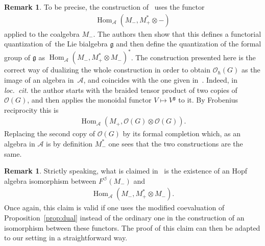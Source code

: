 \documentclass[11pt]{article}
\numberwithin{equation}{section}
\newcommand{\ca}{\circlearrowleft}
\newcommand{\mf}[1]{\mathfrak{#1}}
\newcommand{\h}{\hslash}
\newcommand{\ot}{\otimes}
\newcommand{\cO}{\mathcal O}
\newcommand{\cA}{\mathcal {A}}
\renewcommand{\hom}{\operatorname{Hom}}
\theoremstyle{definition}
\newtheorem{rmk}[thm]{Remark}
\begin{document}
\begin{rmk}\label{rmk:EK}
	To be precise, the construction of~\cite{Etingof1996} uses the functor
\begin{gather*}
		\hom_\cA(M_-,M_+^*\ot -)
	\end{gather*} applied to the coalgebra $M_-$. The authors then show that this def\/ines a functorial quantization of~the Lie bialgebra $\mf g$ and then def\/ine the quantization of the formal group of $\mf g$ as $\hom_\cA(M_-,M_+^*\ot M_-)^*$. The construction presented here is the correct way of dualizing the whole construction in order to obtain $\cO_\h(G)$ as the image of an algebra in~$\cA$, and coincides with the one given in~\cite{Severa2016}. Indeed, in \emph{loc.\ cit.} the author starts with the braided tensor product of two copies of~$\cO(G)$, and then applies the monoidal functor $V\mapsto V^{\mf g}$ to it. By Frobenius reciprocity this is
	\begin{gather*}
		\hom_\cA(M_+,\cO(G)\ot \cO(G)).
	\end{gather*}
	Replacing the second copy of $\cO(G)$ by its formal completion which, as an algebra in $\cA$ is by def\/inition $M_-^*$ one sees that the two constructions are the same.
\end{rmk}
\begin{rmk}
	Strictly speaking, what is claimed in~\cite{Etingof1996} is the existence of an Hopf algebra isomorphism between $F^\ca(M_-)$ and
	\begin{gather*}
		\hom_\cA(M_-,M_+^*\ot M_-).
	\end{gather*}
	Once again, this claim is valid if one uses the modif\/ied coevaluation of Proposition~\ref{prop:dual} instead of the ordinary one in the construction of an isomorphism between these functors. The proof of this claim can then be adapted to our setting in a straightforward way.
\end{rmk}
\end{document}
